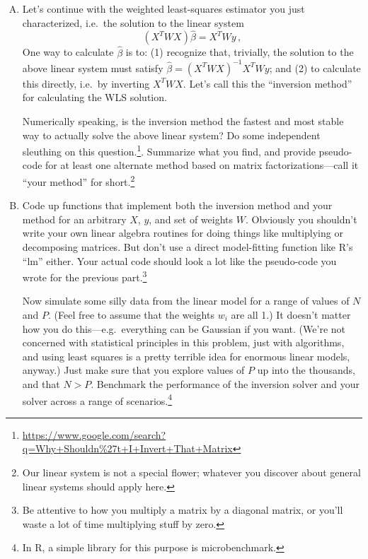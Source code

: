 \documentclass[11pt]{article}
\begin{document}
\begin{enumerate}[(A)]

\item Let's continue with the weighted least-squares estimator you just characterized, i.e.~the solution to the linear system
$$
(X^T W X) \hat \beta = X^T W y \, ,
$$
One way to calculate $\hat{\beta}$ is to: (1) recognize that, trivially, the solution to the above linear system must satisfy $\hat \beta = (X^T W X)^{-1} X^T W y$; and (2) to calculate this directly, i.e.~by inverting $X^T W X$.  Let's call this the ``inversion method'' for calculating the WLS solution.

Numerically speaking, is the inversion method the fastest and most stable way to actually solve the above linear system?  Do some independent sleuthing on this question.\footnote{\url{https://www.google.com/search?q=Why+Shouldn\%27t+I+Invert+That+Matrix}}.   Summarize what you find, and provide pseudo-code for at least one alternate method based on matrix factorizations---call it ``your method'' for short.\footnote{Our linear system is not a special flower; whatever you discover about general linear systems should apply here.}

\item Code up functions that implement both the inversion method and your method for an arbitrary $X$, $y$, and set of weights $W$.  Obviously you shouldn't write your own linear algebra routines for doing things like multiplying or decomposing matrices.  But don't use a direct model-fitting function like R's ``lm'' either.   Your actual code should look a lot like the pseudo-code you wrote for the previous part.\footnote{Be attentive to how you multiply a matrix by a diagonal matrix, or you'll waste a lot of time multiplying stuff by zero.}

Now simulate some silly data from the linear model for a range of values of $N$ and $P$.  (Feel free to assume that the weights $w_i$ are all 1.)  It doesn't matter how you do this---e.g.~everything can be Gaussian if you want.  (We're not concerned with statistical principles in this problem, just with algorithms, and using least squares is a pretty terrible idea for enormous linear models, anyway.)  Just make sure that you explore values of $P$ up into the thousands, and that $N > P$.  Benchmark the performance of the inversion solver and your solver across a range of scenarios.\footnote{In R, a simple library for this purpose is microbenchmark.}

\end{enumerate}
\end{document}
